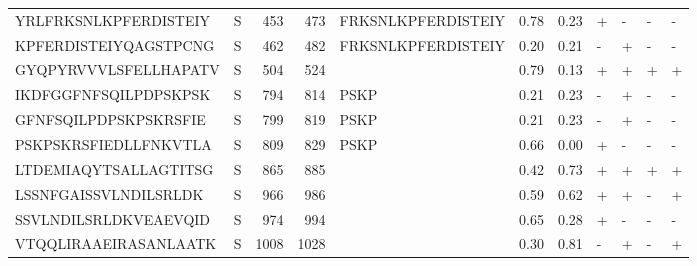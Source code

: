 \begin{tabular}{llrrlrrllll}
YRLFRKSNLKPFERDISTEIY &       S &    453 &   473 &  FRKSNLKPFERDISTEIY &            0.78 &             0.23 &      + &       - &      - &       - \\
KPFERDISTEIYQAGSTPCNG &       S &    462 &   482 &  FRKSNLKPFERDISTEIY &            0.20 &             0.21 &      - &       + &      - &       - \\
GYQPYRVVVLSFELLHAPATV &       S &    504 &   524 &                     &            0.79 &             0.13 &      + &       + &      + &       + \\
IKDFGGFNFSQILPDPSKPSK &       S &    794 &   814 &                PSKP &            0.21 &             0.23 &      - &       + &      - &       - \\
GFNFSQILPDPSKPSKRSFIE &       S &    799 &   819 &                PSKP &            0.21 &             0.23 &      - &       + &      - &       - \\
PSKPSKRSFIEDLLFNKVTLA &       S &    809 &   829 &                PSKP &            0.66 &             0.00 &      + &       - &      - &       - \\
LTDEMIAQYTSALLAGTITSG &       S &    865 &   885 &                     &            0.42 &             0.73 &      + &       + &      + &       + \\
LSSNFGAISSVLNDILSRLDK &       S &    966 &   986 &                     &            0.59 &             0.62 &      + &       + &      - &       + \\
SSVLNDILSRLDKVEAEVQID &       S &    974 &   994 &                     &            0.65 &             0.28 &      + &       - &      - &       - \\
VTQQLIRAAEIRASANLAATK &       S &   1008 &  1028 &                     &            0.30 &             0.81 &      - &       + &      - &       + \\
\bottomrule
\end{tabular}
